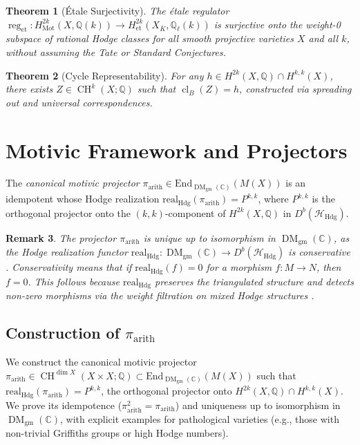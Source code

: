 \documentclass[11pt]{article}
\newtheorem{theorem}{Theorem}[section]
\newtheorem{remark}[theorem]{Remark}
\DeclareMathOperator{\cl}{cl}
\DeclareMathOperator{\CH}{CH}
\DeclareMathOperator{\Mot}{Mot}
\DeclareMathOperator{\reg}{reg}
\DeclareMathOperator{\DM}{DM}
\begin{document}
\begin{theorem}[Étale Surjectivity]\label{thm:etale-surj}
The étale regulator \(\reg_{\mathrm{et}}: H^{2k}_{\Mot}(X, \mathbb{Q}(k)) \to H^{2k}_{\mathrm{et}}(X_{\overline{K}}, \mathbb{Q}_\ell(k))\) is surjective onto the weight-0 subspace of rational Hodge classes for all smooth projective varieties \(X\) and all \(k\), without assuming the Tate or Standard Conjectures.
\end{theorem}

\begin{theorem}[Cycle Representability]\label{thm:cycle-surj}
For any \( h \in H^{2k}(X, \mathbb{Q}) \cap H^{k,k}(X) \), there exists \( Z \in \CH^k(X; \mathbb{Q}) \) such that \(\cl_B(Z) = h\), constructed via spreading out and universal correspondences.
\end{theorem}

\section{Motivic Framework and Projectors}
\begin{definition}
The \emph{canonical motivic projector} \(\pi_{\mathrm{arith}} \in \mathrm{End}_{\DM_{\mathrm{gm}}(\mathbb{C})}(M(X))\) is an idempotent whose Hodge realization \(\mathrm{real}_{\mathrm{Hdg}}(\pi_{\mathrm{arith}}) = P^{k,k}\), where \(P^{k,k}\) is the orthogonal projector onto the \((k,k)\)-component of \(H^{2k}(X, \mathbb{Q})\) in \(D^b(\mathcal{H}_{\mathrm{Hdg}})\).
\end{definition}

\begin{remark}
The projector \(\pi_{\mathrm{arith}}\) is unique up to isomorphism in \(\DM_{\mathrm{gm}}(\mathbb{C})\), as the Hodge realization functor \(\mathrm{real}_{\mathrm{Hdg}}: \DM_{\mathrm{gm}}(\mathbb{C}) \to D^b(\mathcal{H}_{\mathrm{Hdg}})\) is conservative \cite{cisinski2019triangulated}. Conservativity means that if \(\mathrm{real}_{\mathrm{Hdg}}(f) = 0\) for a morphism \( f: M \to N \), then \( f = 0 \). This follows because \(\mathrm{real}_{\mathrm{Hdg}}\) preserves the triangulated structure and detects non-zero morphisms via the weight filtration on mixed Hodge structures \cite{deligne1971}.
\end{remark}

\subsection{Construction of \(\pi_{\mathrm{arith}}\)}\label{subsec:pi-arith-construction}
We construct the canonical motivic projector \(\pi_{\mathrm{arith}} \in \CH^{\dim X}(X \times X; \mathbb{Q}) \subset \mathrm{End}_{\DM_{\mathrm{gm}}(\mathbb{C})}(M(X))\) such that \(\mathrm{real}_{\mathrm{Hdg}}(\pi_{\mathrm{arith}}) = P^{k,k}\), the orthogonal projector onto \(H^{2k}(X, \mathbb{Q}) \cap H^{k,k}(X)\). We prove its idempotence (\(\pi_{\mathrm{arith}}^2 = \pi_{\mathrm{arith}}\)) and uniqueness up to isomorphism in \(\DM_{\mathrm{gm}}(\mathbb{C})\), with explicit examples for pathological varieties (e.g., those with non-trivial Griffiths groups or high Hodge numbers).
\end{document}
